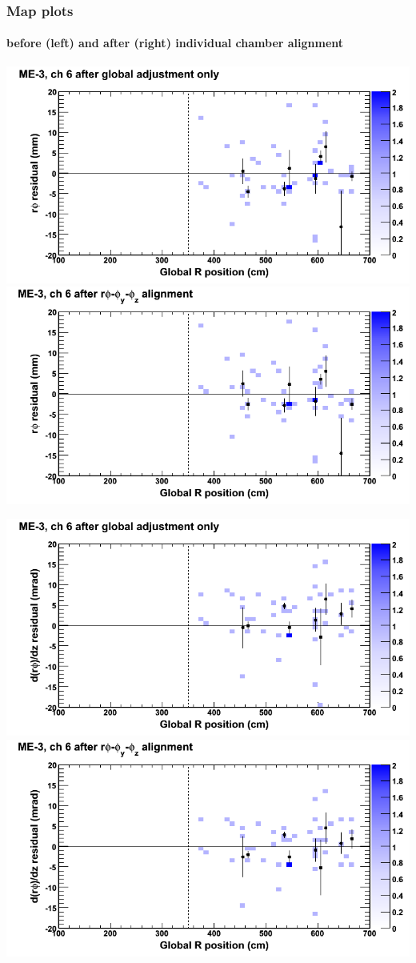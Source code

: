 \documentclass[compress]{beamer}
\begin{document}
\begin{frame}
\frametitle{Map plots}
\framesubtitle{before (left) and after (right) individual chamber alignment}
\includegraphics[width=0.5\linewidth]{ringmapplots_3dof/before_CSCvsr_mem3ch06_x.png} \includegraphics[width=0.5\linewidth]{ringmapplots_3dof/after_CSCvsr_mem3ch06_x.png}

\includegraphics[width=0.5\linewidth]{ringmapplots_3dof/before_CSCvsr_mem3ch06_dxdz.png} \includegraphics[width=0.5\linewidth]{ringmapplots_3dof/after_CSCvsr_mem3ch06_dxdz.png}
\end{frame}
\end{document}
